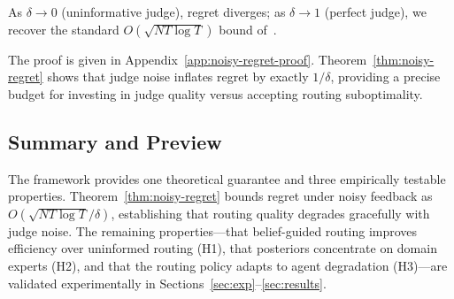 \begin{corollary}
As $\delta\to 0$ (uninformative judge), regret diverges; as
$\delta\to 1$ (perfect judge), we recover the standard
$O(\sqrt{NT\log T})$ bound of~\citet{AgrawalGoyal13}.
\end{corollary}

\noindent The proof is given in Appendix~\ref{app:noisy-regret-proof}. Theorem~\ref{thm:noisy-regret} shows that judge noise inflates regret by exactly $1/\delta$, providing a precise budget for investing in judge quality versus accepting routing suboptimality.

\subsection{Summary and Preview}
The framework provides one theoretical guarantee and three empirically testable properties. Theorem~\ref{thm:noisy-regret} bounds regret under noisy feedback as $O(\sqrt{NT\log T}/\delta)$, establishing that routing quality degrades gracefully with judge noise. The remaining properties---that belief-guided routing improves efficiency over uninformed routing (H1), that posteriors concentrate on domain experts (H2), and that the routing policy adapts to agent degradation (H3)---are validated experimentally in Sections~\ref{sec:exp}--\ref{sec:results}.
